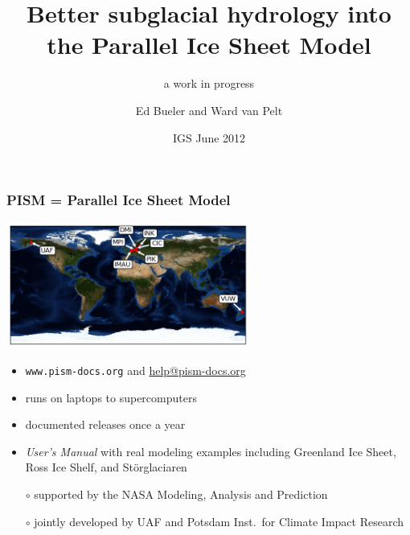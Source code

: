 \documentclass[hide notes,intlimits]{beamer}
\title[Better subglacial hydrology into PISM]{Better subglacial hydrology into \\ the Parallel Ice Sheet Model}
\subtitle{a work in progress}
\author[Bueler \and van Pelt]{Ed Bueler\inst{*} and Ward van Pelt\inst{\dagger}}
\institute{\inst{*} University of Alaska Fairbanks \and %
           \inst{\dagger} IMAU, Utrecht, Netherlands}
\date{IGS June 2012}
\begin{document}
{
}

\begin{frame}
  \titlepage
\end{frame}


\newcommand{\scream}[1]{\alert{\textbf{#1}}}

\begin{frame}
  \frametitle{PISM = Parallel Ice Sheet Model}

  \begin{center}
      \includegraphics[width=80mm]{figs/pism-users-map}
  \end{center}

\vspace{-2mm}
  \begin{itemize}
  \item \alert{\large\texttt{www.pism-docs.org}}  and  \url{help@pism-docs.org}
  \item runs on laptops to supercomputers
  \item documented releases once a year
  \item \emph{User's Manual} with real modeling examples including Greenland Ice Sheet, Ross Ice Shelf, and St\"orglaciaren
  
  \bigskip
  \scriptsize
  \item[$\circ$] supported by the NASA Modeling, Analysis and Prediction
  \item[$\circ$] jointly developed by UAF and Potsdam Inst.~for Climate Impact Research
  \end{itemize}
\end{frame}


\newcommand{\whytitle}{why we need better subglacial hydrology}
\end{document}
